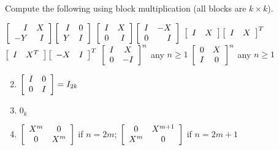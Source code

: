 \begin{multicols}{2}
\begin{ex}
Compute the following using block multiplication (all blocks are $k \times k$).
\begin{exenumerate}
\exitem
$\left[ \begin{array}{rr}
I & X \\
-Y & I
\end{array} \right] \left[ \begin{array}{rr}
I & 0 \\
Y & I
\end{array} \right]
$
\exitem 
$\left[ \begin{array}{rr}
I & X \\
0 & I
\end{array} \right] \left[ \begin{array}{rr}
I & -X \\
0 & I
\end{array} \right]
$
\exitem 
$\left[ \begin{array}{cc}
I & X
\end{array} \right] \left[ \begin{array}{cc}
I & X
\end{array} \right]^{T}
$
\exitem
$\left[ \begin{array}{cc}
I & X^{T}
\end{array} \right] \left[ \begin{array}{cc}
-X & I
\end{array} \right]^{T}
$
\exitem*
$\left[ \begin{array}{cc}
I & X \\
0 & -I
\end{array} \right]^{n}
$ any $n \geq 1$
\exitem* 
$\left[ \begin{array}{cc}
0 & X \\
I & 0
\end{array} \right]^{n}
$ any $n \geq 1$
\end{exenumerate}
\begin{sol}
\begin{enumerate}[label={\alph*.}]
\setcounter{enumi}{1}
\item
$\left[ \begin{array}{cc}
I & 0 \\
0 & I
\end{array} \right] = I_{2k}$

\setcounter{enumi}{3}
\item $0_{k}$


\setcounter{enumi}{5}
\item
$\left[ \begin{array}{cc}
X^{m} & 0 \\
0 & X^{m}
\end{array} \right]$ if $n = 2m$; 
$\left[ \begin{array}{cc}
0 & X^{m + 1} \\
X^{m} & 0
\end{array} \right]$ if $n = 2m + 1$



\end{enumerate}
\end{sol}
\end{ex}
\end{multicols}
